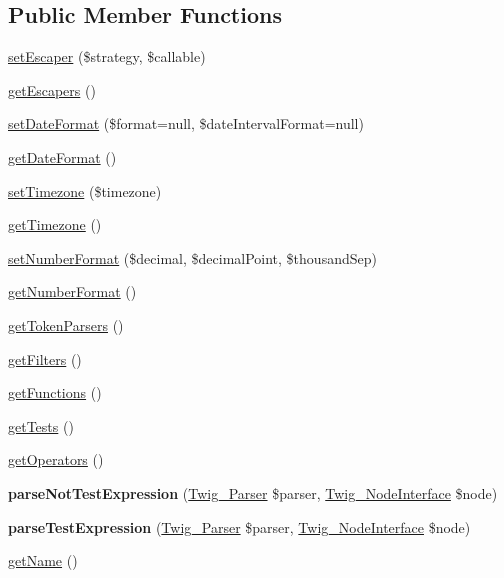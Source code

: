 \subsection*{Public Member Functions}
\begin{DoxyCompactItemize}
\item 
\hyperlink{classTwig__Extension__Core_a7be970a3285173785c3c9fcc628ac246}{set\+Escaper} (\$strategy, \$callable)
\item 
\hyperlink{classTwig__Extension__Core_a7aa01bce9b4f1cc650dc42228085f575}{get\+Escapers} ()
\item 
\hyperlink{classTwig__Extension__Core_ac393d17945d205f7b26c8201a4c5da0e}{set\+Date\+Format} (\$format=null, \$date\+Interval\+Format=null)
\item 
\hyperlink{classTwig__Extension__Core_acb288b43ae560429a6885aabeef642fd}{get\+Date\+Format} ()
\item 
\hyperlink{classTwig__Extension__Core_a5612462e799efbdff5014cc1582c92ba}{set\+Timezone} (\$timezone)
\item 
\hyperlink{classTwig__Extension__Core_a0f82820d9ba27f561ee0665c9b2ad4db}{get\+Timezone} ()
\item 
\hyperlink{classTwig__Extension__Core_aa698c988d3aee495f4c37f746bdfcebc}{set\+Number\+Format} (\$decimal, \$decimal\+Point, \$thousand\+Sep)
\item 
\hyperlink{classTwig__Extension__Core_a60ae232c877d39392778fa70509e5968}{get\+Number\+Format} ()
\item 
\hyperlink{classTwig__Extension__Core_aa6baea0de55dae9eff77f64a98eb95d5}{get\+Token\+Parsers} ()
\item 
\hyperlink{classTwig__Extension__Core_a32b474b30af76d6308bda4af63eefcef}{get\+Filters} ()
\item 
\hyperlink{classTwig__Extension__Core_a93868bdacb8a73f7fc0a0e192f18d2c1}{get\+Functions} ()
\item 
\hyperlink{classTwig__Extension__Core_ad877131fa0d17d281808540d43a04d26}{get\+Tests} ()
\item 
\hyperlink{classTwig__Extension__Core_a953091f81be3e9d91bf5e843d4a62aef}{get\+Operators} ()
\item 
{\bfseries parse\+Not\+Test\+Expression} (\hyperlink{classTwig__Parser}{Twig\+\_\+\+Parser} \$parser, \hyperlink{interfaceTwig__NodeInterface}{Twig\+\_\+\+Node\+Interface} \$node)\hypertarget{classTwig__Extension__Core_a3ac5df093775b8d595650c2945fb008e}{}\label{classTwig__Extension__Core_a3ac5df093775b8d595650c2945fb008e}

\item 
{\bfseries parse\+Test\+Expression} (\hyperlink{classTwig__Parser}{Twig\+\_\+\+Parser} \$parser, \hyperlink{interfaceTwig__NodeInterface}{Twig\+\_\+\+Node\+Interface} \$node)\hypertarget{classTwig__Extension__Core_a49e38022976bbbec390c297b888e9fad}{}\label{classTwig__Extension__Core_a49e38022976bbbec390c297b888e9fad}

\item 
\hyperlink{classTwig__Extension__Core_a5c9c8c50dd864e896d75c87b8b1089ca}{get\+Name} ()
\end{DoxyCompactItemize}
